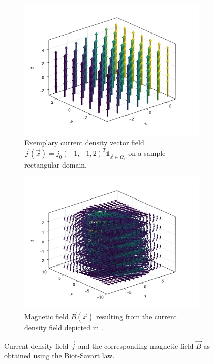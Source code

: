 \documentclass[10pt]{article}
\begin{document}
  \begin{figure}[H]
    \centering
    \begin{subfigure}[t]{0.48\textwidth}
      \centering
      \includegraphics[width=\textwidth]{../figures/homo-cdp-j-field.pdf}
      \caption{Exemplary current density vector field $\vec{j}(\vec{x}) = {j}_0 (-1, -1, 2)^T \mathds{1}_{\vec{x} \in \Omega_s}$ on a sample rectangular domain.}
      \label{fig:demo-cdp-j-field}
    \end{subfigure}
    \hfill
    \begin{subfigure}[t]{0.48\textwidth}
      \centering
      \includegraphics[width=\textwidth]{../figures/homo-cdp-b-field.pdf}
      \caption{Magnetic field $\vec{B}(\vec{x})$ resulting from the current density field depicted in .}
      \label{fig:demo-cdp-b-field}
    \end{subfigure}
    \caption{Current density field $\vec{j}$ and the corresponding magnetic field $\vec{B}$ as obtained using the Biot-Savart law.}
  \end{figure}
\end{document}
